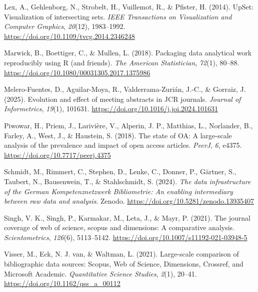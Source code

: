 \documentclass[a4paper,man,floatsintext,longtable,noextraspace,10pt]{apa6}
\newlength{\cslhangindent}
\newenvironment{CSLReferences}[2] %
{\begin{list}{}{%
  \setlength{\itemindent}{0pt}
  \setlength{\leftmargin}{0pt}
  \setlength{\parsep}{0pt}
  \ifodd #1
  \setlength{\leftmargin}{\cslhangindent}
  \setlength{\itemindent}{-1\cslhangindent}
  \fi
  \setlength{\itemsep}{#2\baselineskip}}}
{\end{list}}
\begin{document}
\begin{CSLReferences}{1}{0}
Lex, A., Gehlenborg, N., Strobelt, H., Vuillemot, R., \& Pfister, H.
(2014). UpSet: Visualization of intersecting sets. \emph{IEEE
Transactions on Visualization and Computer Graphics}, \emph{20}(12),
1983--1992. \url{https://doi.org/10.1109/tvcg.2014.2346248}

Marwick, B., Boettiger, C., \& Mullen, L. (2018). Packaging data
analytical work reproducibly using {R} (and friends). \emph{The American
Statistician}, \emph{72}(1), 80--88.
\url{https://doi.org/10.1080/00031305.2017.1375986}

Melero-Fuentes, D., Aguilar-Moya, R., Valderrama-Zurián, J.-C., \&
Gorraiz, J. (2025). Evolution and effect of meeting abstracts in JCR
journals. \emph{Journal of Informetrics}, \emph{19}(1), 101631.
\url{https://doi.org/10.1016/j.joi.2024.101631}

Piwowar, H., Priem, J., Larivière, V., Alperin, J. P., Matthias, L.,
Norlander, B., Farley, A., West, J., \& Haustein, S. (2018). The state
of {OA}: A large-scale analysis of the prevalence and impact of open
access articles. \emph{{PeerJ}}, \emph{6}, e4375.
\url{https://doi.org/10.7717/peerj.4375}

Schmidt, M., Rimmert, C., Stephen, D., Lenke, C., Donner, P., Gärtner,
S., Taubert, N., Bausenwein, T., \& Stahlschmidt, S. (2024). \emph{The
data infrastructure of the {German Kompetenznetzwerk Bibliometrie}: An
enabling intermediary between raw data and analysis}. Zenodo.
\url{https://doi.org/10.5281/zenodo.13935407}

Singh, V. K., Singh, P., Karmakar, M., Leta, J., \& Mayr, P. (2021). The
journal coverage of web of science, scopus and dimensions: A comparative
analysis. \emph{Scientometrics}, \emph{126}(6), 5113--5142.
\url{https://doi.org/10.1007/s11192-021-03948-5}

Visser, M., Eck, N. J. van, \& Waltman, L. (2021). Large-scale
comparison of bibliographic data sources: {Scopus, Web of Science,
Dimensions, Crossref, and Microsoft Academic}. \emph{Quantitative
Science Studies}, \emph{2}(1), 20--41.
\url{https://doi.org/10.1162/qss_a_00112}

\end{CSLReferences}
\end{document}
